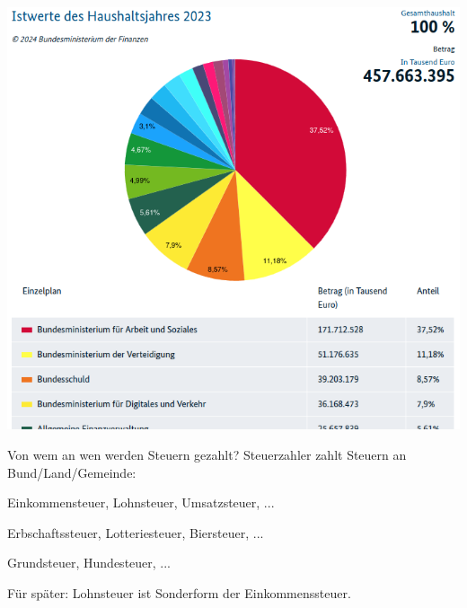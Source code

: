 \documentclass{beamer}
\begin{document}
			\begin{frame}
				\begin{center}
					\includegraphics[height=\textheight]{images/bundeshaushalt.png}
				\end{center}
			\end{frame}
		
			\begin{frame}{Von wem an wen werden Steuern gezahlt?}
				Steuerzahler zahlt Steuern an Bund/Land/Gemeinde:\n
				
				\begin{description}[An Gemeinde]
					\item[An Bund] Einkommensteuer, Lohnsteuer, Umsatzsteuer, ...
					\item[An Land] Erbschaftssteuer, Lotteriesteuer, Biersteuer, ...
					\item[An Gemeinde] Grundsteuer, Hundesteuer, ...
				\end{description}
				\pause
				Für später: Lohnsteuer ist Sonderform der Einkommenssteuer.
			\end{frame}
		
\end{document}
